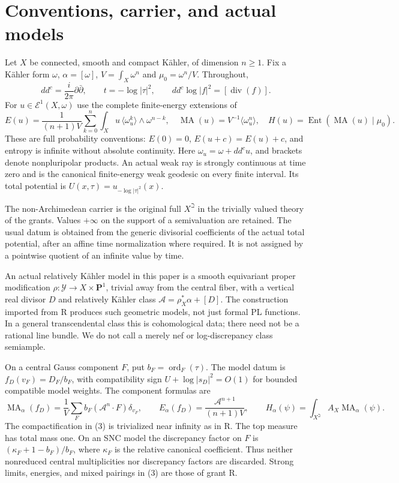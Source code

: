 \documentclass[11pt]{article}
\newcommand{\MA}{\operatorname{MA}}
\newcommand{\Ent}{\operatorname{Ent}}
\begin{document}
\section{Conventions, carrier, and actual models}
Let $X$ be connected, smooth and compact K\"ahler, of dimension $n\ge1$.
Fix a K\"ahler form $\omega$, $\alpha=[\omega]$,
$V=\int_X\omega^n$ and $\mu_0=\omega^n/V$. Throughout,
\[
 dd^c=\frac{i}{2\pi}\partial\bar\partial,\qquad
 t=-\log|\tau|^2,\qquad dd^c\log|f|^2=[\operatorname{div}(f)].
 \tag{1}
\]
For $u\in\mathcal E^1(X,\omega)$ use the complete finite-energy
extensions of
\[
 E(u)=\frac1{(n+1)V}\sum_{k=0}^n
  \int_X u\,\langle\omega_u^k\rangle\wedge\omega^{n-k},\quad
 \MA(u)=V^{-1}\langle\omega_u^n\rangle,\quad
 H(u)=\Ent(\MA(u)\mid\mu_0).
 \tag{2}
\]
These are full probability conventions: $E(0)=0$, $E(u+c)=E(u)+c$,
and entropy is infinite without absolute continuity. Here
$\omega_u=\omega+dd^cu$, and brackets denote nonpluripolar products.
An actual weak ray is strongly continuous at time zero and is the
canonical finite-energy weak geodesic on every finite interval.
Its total potential is $U(x,\tau)=u_{-\log|\tau|^2}(x)$.

The non-Archimedean carrier is the original full $X^\beth$ in the
trivially valued theory of the grants. Values $+\infty$ on the support
of a semivaluation are retained. The usual datum is obtained from
the generic divisorial coefficients of the actual total potential,
after an affine time normalization where required. It is not assigned
by a pointwise quotient of an infinite value by time.

An actual relatively K\"ahler model in this paper is a smooth
equivariant proper modification
$\rho:\mathcal Y\to X\times\mathbf P^1$, trivial away from the central
fiber, with a vertical real divisor $D$ and relatively K\"ahler class
$\mathcal A=\rho_X^*\alpha+[D]$. The construction imported from R
produces such geometric models, not just formal PL functions.
In a general transcendental class this is cohomological data;
there need not be a rational line bundle. We do not call a merely
nef or log-discrepancy class semiample.

On a central Gauss component $F$, put $b_F=\operatorname{ord}_F(\tau)$.
The model datum is $f_D(v_F)=D_F/b_F$, with compatibility sign
$U+\log|s_D|^2=O(1)$ for bounded compatible model weights.
The component formulas are
\[
 \MA_\alpha(f_D)=\frac1V\sum_F b_F(\mathcal A^n\cdot F)\delta_{v_F},
 \qquad E_\alpha(f_D)=\frac{\mathcal A^{n+1}}{(n+1)V},
 \qquad H_\alpha(\psi)=\int_{X^\beth}A_X\MA_\alpha(\psi).
 \tag{3}
\]
The compactification in (3) is trivialized near infinity as in R.
The top measure has total mass one. On an SNC model the discrepancy
factor on $F$ is $(\kappa_F+1-b_F)/b_F$, where $\kappa_F$ is the
relative canonical coefficient. Thus neither nonreduced central
multiplicities nor discrepancy factors are discarded. Strong limits,
energies, and mixed pairings in (3) are those of grant R.
\end{document}
